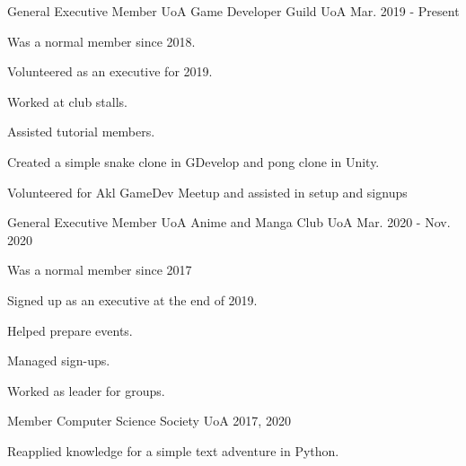

\begin{cventries}

\cventry
{General Executive Member} %
{UoA Game Developer Guild} %
{UoA} %
{Mar. 2019 - Present} %
{
  \begin{cvitems} %
    \item {Was a normal member since 2018.}
    \item {Volunteered as an executive for 2019.}
    \item {Worked at club stalls.}
    \item {Assisted tutorial members.}
    \item {Created a simple snake clone in GDevelop and pong clone in Unity.}
    \item {Volunteered for Akl GameDev Meetup and assisted in setup and signups}
  \end{cvitems}
}

  \cventry
    {General Executive Member} %
    {UoA Anime and Manga Club} %
    {UoA} %
    {Mar. 2020 - Nov. 2020} %
    {
      \begin{cvitems} %
        \item {Was a normal member since 2017}
        \item {Signed up as an executive at the end of 2019.}
        \item {Helped prepare events.}
        \item {Managed sign-ups.}
        \item {Worked as leader for groups.}
      \end{cvitems}
    }

  \cventry
    {Member} %
    {Computer Science Society} %
    {UoA} %
    {2017, 2020} %
    {
      \begin{cvitems} %
        \item {Reapplied knowledge for a simple text adventure in Python.}
      \end{cvitems}
    }


\end{cventries}
